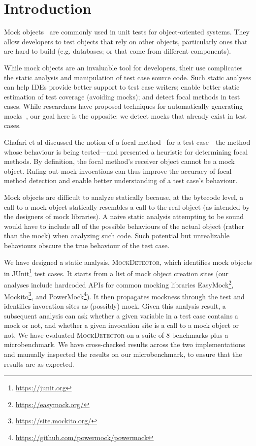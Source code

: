 \section{Introduction}
\label{sec:introduction}

Mock objects~\cite{beck02:_test_driven_devel} are commonly used in
unit tests for object-oriented systems.  They allow developers to test objects that 
rely on other objects, particularly ones that are hard 
to build (e.g. databases; or that come from different components).

While mock objects are an invaluable tool for developers, their use
complicates the static analysis and manipulation of test case source code. 
Such static analyses can help IDEs provide better
support to test case writers; enable better static estimation of test coverage
(avoiding mocks); and detect focal methods in test cases. While researchers have
proposed techniques for automatically generating mocks~\cite{alshahwan10:_autom,fazzini20:_framew_autom_test_mockin_mobil_apps}, our goal here is the opposite:
we detect mocks that already exist in test cases.

Ghafari et al discussed the notion of a focal method~\cite{ghafari15:_autom} for a test case---the method
whose behaviour is being tested---and presented a heuristic for determining focal methods.
By definition, the focal method's receiver object cannot be a mock object.
Ruling out mock invocations can thus improve the accuracy of focal method detection and
enable better understanding of a test case's behaviour.

Mock objects are difficult to analyze statically because, at the bytecode level,
a call to a mock object statically resembles a call to the real object (as
intended by the designers of mock libraries).
A naive static analysis attempting to be sound would have to include all of 
the possible behaviours of the actual object (rather than the mock) when analyzing such code. 
Such potential but unrealizable behaviours obscure the true behaviour 
of the test case.

We have designed a static analysis, \textsc{MockDetector}, which identifies
mock objects in JUnit\footnote{\url{https://junit.org}} test cases. It starts from a list of mock object creation sites
(our analyses include hardcoded APIs for common mocking libraries EasyMock\footnote{\url{https://easymock.org/}}, Mockito\footnote{\url{https://site.mockito.org/}}, and PowerMock\footnote{\url{https://github.com/powermock/powermock}}). 
It then propagates mockness
through the test and identifies invocation sites as (possibly) mock.
Given this analysis result, a subsequent analysis
can ask whether a given variable in a test case contains a mock or not, and
whether a given invocation site is a call to a mock object or not. We have
evaluated \textsc{MockDetector} on a suite of 8 benchmarks plus a microbenchmark. 
We have cross-checked results across the two implementations and manually inspected
the results on our microbenchmark, to ensure that the results are as expected.

